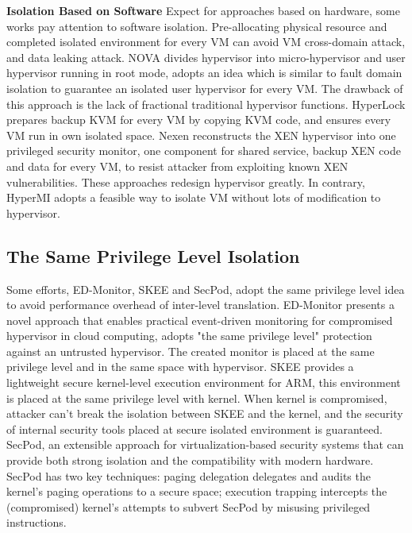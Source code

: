\documentclass[conference]{IEEEtran}
\begin{document}
\textbf{Isolation Based on Software }
Expect for approaches based on hardware, some works\cite{nexen,Steinberg2010NOVA,hyperlock} pay attention to software isolation. Pre-allocating physical resource and completed isolated environment for every VM can avoid VM cross-domain attack, and data leaking attack. NOVA\cite{Steinberg2010NOVA} divides hypervisor into micro-hypervisor and user hypervisor running in root mode, adopts an idea which is similar to fault domain isolation to guarantee an isolated user hypervisor for every VM. The drawback of this approach is the lack of fractional traditional hypervisor functions. HyperLock \cite{hyperlock} prepares backup KVM for every VM by copying KVM code, and ensures every VM run in own isolated space. Nexen\cite{nexen} reconstructs the XEN hypervisor into one privileged security monitor, one component for shared service, backup XEN code and data for every VM, to resist attacker from exploiting known XEN vulnerabilities. These approaches redesign hypervisor greatly. In contrary, HyperMI adopts a feasible way to isolate VM without lots of modification to hypervisor. 

\subsection{The Same Privilege Level Isolation}
Some efforts, ED-Monitor\cite{Deng2017Dancing}, SKEE\cite{Azab2016SKEE} and SecPod\cite{Wang2015SecPod}, adopt the same privilege level idea to avoid performance overhead of inter-level translation. ED-Monitor presents a novel approach that enables practical event-driven monitoring for compromised hypervisor in cloud computing, adopts "the same privilege level" protection against an untrusted hypervisor. The created monitor is placed at the same privilege level and in the same space with hypervisor. SKEE provides a lightweight secure kernel-level execution environment for ARM, this environment is placed at the same privilege level with kernel. When kernel is compromised, attacker can't break the isolation between SKEE and the kernel, and the security of internal security tools placed at secure isolated environment is guaranteed. SecPod, an extensible approach for virtualization-based security systems that can provide both strong isolation and the compatibility with modern hardware. SecPod has two key techniques: paging delegation delegates and audits the kernel's paging operations to a secure space; execution trapping intercepts the (compromised) kernel's attempts to subvert SecPod by misusing privileged instructions.
\end{document}
